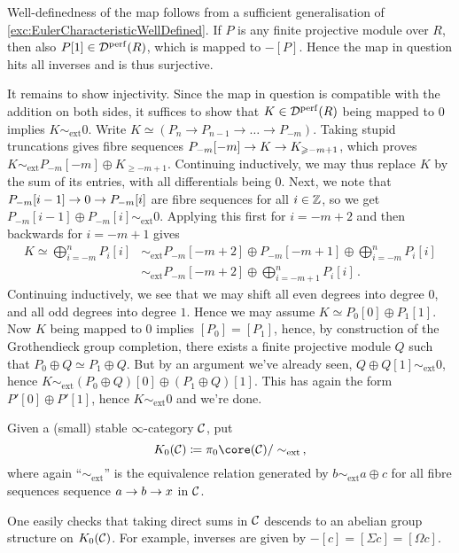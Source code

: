 \documentclass[a4paper, 10pt, oneside, DIV=9, chapterprefix=true, numbers=enddot,bibliography=totoc]{scrbook}
\begin{document}
\begin{proof*}
	Well-definedness of the map follows from a sufficient generalisation of \cref{exc:EulerCharacteristicWellDefined}. If $P$ is any finite projective module over $R$, then also $P[1]\in \mathcal{D}^{\mathrm{perf}}(R)$, which is mapped to $-[P]$. Hence the map in question hits all inverses and is thus surjective. 
	
	It remains to show injectivity. Since the map in question is compatible with the addition on both sides, it suffices to show that $K\in \mathcal{D}^{\mathrm{perf}}(R)$ being mapped to $0$ implies $K\sim_{\mathrm{ext}}0$. Write $K\simeq (P_n\rightarrow P_{n-1}\rightarrow \dotso \rightarrow P_{-m})$. Taking stupid truncations gives fibre sequences $P_{-m}[-m]\morphism K\morphism K_{\geq -m+1}$, which proves $K\sim_{\mathrm{ext}} P_{-m}[-m]\oplus K_{\geq -m+1}$. Continuing inductively, we may thus replace $K$ by the sum of its entries, with all differentials being $0$. Next, we note that $P_{-m}[i-1]\morphism 0 \morphism P_{-m}[i]$ are fibre sequences for all $i\in\mathbb{Z}$, so we get $P_{-m}[i-1]\oplus P_{-m}[i]\sim_{\mathrm{ext}}0$. Applying this first for $i=-m+2$ and then backwards for $i=-m+1$ gives
	\begin{align*}
		K\simeq \bigoplus_{i=-m}^nP_{i}[i]&\sim_\mathrm{ext} P_{-m}[-m+2]\oplus P_{-m}[-m+1]\oplus\bigoplus_{i=-m}^nP_{i}[i]\\
		&\sim_{\mathrm{ext}} P_{-m}[-m+2]\oplus \bigoplus_{i=-m+1}^nP_{i}[i]\,.
	\end{align*}
	Continuing inductively, we see that we may shift all even degrees into degree $0$, and all odd degrees into degree $1$. Hence we may assume $K\simeq P_0[0]\oplus P_1[1]$. Now $K$ being mapped to $0$ implies $[P_0]=[P_1]$, hence, by construction of the Grothendieck group completion, there exists a finite projective module $Q$ such that $P_0\oplus Q\simeq P_1\oplus Q$. But by an argument we've already seen, $Q\oplus Q[1]\sim_{\mathrm{ext}}0$, hence $K\sim_{\mathrm{ext}} (P_0\oplus Q)[0]\oplus (P_1\oplus Q)[1]$. This has again the form $P'[0]\oplus P'[1]$, hence $K\sim_{\mathrm{ext}} 0$ and we're done.
\end{proof*}
\begin{defi}\label{def:K0C}
	Given a (small) stable $\infty$-category $\mathcal{C}$, put
	\begin{equation*}
		K_0(\Cc)\coloneqq \pi_0\core(\Cc)/\sim_{\mathrm{ext}}\,,
	\end{equation*}
	where again \enquote{$\sim_\mathrm{ext}$} is the equivalence relation generated by $b\sim_{\mathrm{ext}} a\oplus c$ for all fibre sequences sequence $a\morphism b\morphism x$ in $\mathcal{C}$.
\end{defi}
One easily checks that taking direct sums in $\mathcal{C}$ descends to an abelian group structure on $K_0(\mathcal{C})$. For example, inverses are given by $-[c]=[\Sigma c]=[\Omega c]$.
\end{document}
